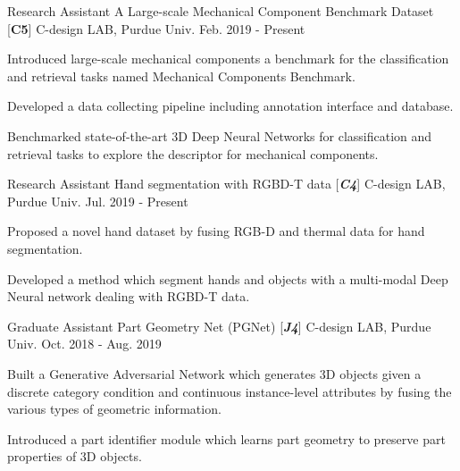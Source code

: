 

\begin{cventries}

\cventry
{Research Assistant} %
{A Large-scale Mechanical Component Benchmark Dataset [\textbf{C5}]} %
{C-design LAB, Purdue Univ.} %
{Feb. 2019 - Present} %
{ %
\begin{cvitems}
\item {Introduced large-scale mechanical components a benchmark for the classification and retrieval tasks named Mechanical Components Benchmark.}
\item {Developed a data collecting pipeline including annotation interface and database.}
\item {Benchmarked state-of-the-art 3D Deep Neural Networks for classification and retrieval tasks to explore the descriptor for mechanical components.}
\end{cvitems}
}

\cventry
{Research Assistant} %
{Hand segmentation with RGBD-T data [\textit{\textbf{C4}}]} %
{C-design LAB, Purdue Univ.} %
{Jul. 2019 - Present} %
{ %
\begin{cvitems}
\item {Proposed a novel hand dataset by fusing RGB-D and thermal data for hand segmentation.}
\item {Developed a method which segment hands and objects with a multi-modal Deep Neural network dealing with RGBD-T data.}
\end{cvitems}
}


\cventry
{Graduate Assistant} %
{Part Geometry Net (PGNet) [\textit{\textbf{J4}}]} %
{C-design LAB, Purdue Univ.} %
{Oct. 2018 - Aug. 2019} %
{ %
\begin{cvitems}
\item {Built a Generative Adversarial Network which generates 3D objects given a discrete category condition and continuous instance-level attributes by fusing the various types of geometric information.}
\item {Introduced a part identifier module which learns part geometry to preserve part properties of 3D objects.}
\end{cvitems}
}


\end{cventries}
